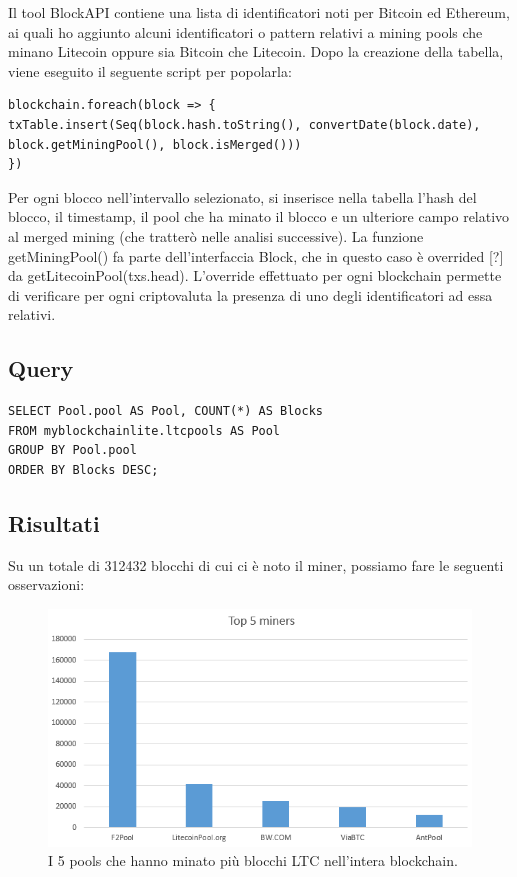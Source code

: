 Il tool BlockAPI contiene una lista di identificatori noti per Bitcoin ed Ethereum, ai quali ho aggiunto alcuni identificatori o pattern relativi a mining pools che minano Litecoin oppure sia Bitcoin che Litecoin. 
Dopo la creazione della tabella, viene eseguito il seguente script per popolarla:

\begin{lstlisting}
blockchain.foreach(block => {
txTable.insert(Seq(block.hash.toString(), convertDate(block.date), block.getMiningPool(), block.isMerged()))
})
\end{lstlisting}

Per ogni blocco nell’intervallo selezionato, si inserisce nella tabella l’hash del blocco, il timestamp, il pool che ha minato il blocco e un ulteriore campo relativo al merged mining (che tratterò nelle analisi successive). La funzione getMiningPool() fa parte dell’interfaccia Block, che in questo caso è overrided [?] da getLitecoinPool(txs.head). L’override effettuato per ogni blockchain permette di verificare per ogni criptovaluta la presenza di uno degli identificatori ad essa relativi.


\subsection{Query}

\begin{lstlisting}
SELECT Pool.pool AS Pool, COUNT(*) AS Blocks
FROM myblockchainlite.ltcpools AS Pool
GROUP BY Pool.pool
ORDER BY Blocks DESC;
\end{lstlisting}

\subsection{Risultati}

Su un totale di 312432 blocchi di cui ci è noto il miner, possiamo fare le seguenti osservazioni:

\begin{figure}[h!]
	\centering
	\includegraphics[width=1.0\linewidth]{images/top5miners}
	\caption{I 5 pools che hanno minato più blocchi LTC nell'intera blockchain.}
	\label{fig:top5miners}
\end{figure}


